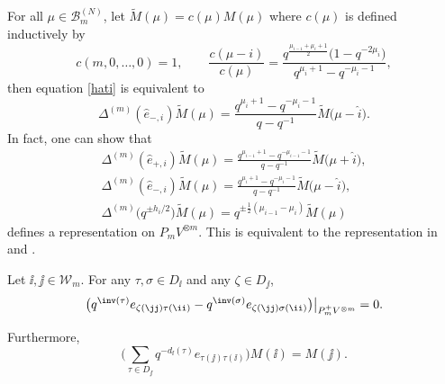 \begin{Remark}\label{ExRep}
	For all $ \mu \in \mathcal{B}^{(N)}_m $, let $ \tilde{M}(\mu)=c(\mu)M(\mu) $ where $ c(\mu) $ is defined inductively by
	\begin{equation*}%
	c(m,0,\dots,0)=1, \qquad
	\frac{c(\mu-i)}{c(\mu)}=\frac{q^{\frac{\mu_{i-1}+\mu_i+1}{2}}\big(1-q^{-2\mu_i}\big)}{q^{\mu_i+1}-q^{-\mu_i-1}} ,
	\end{equation*} then equation \eqref{hati} is equivalent to
\begin{equation*}%
	\Delta^{(m)} (\hat{e}_{-,i}) \tilde{M}(\mu) =\frac{q^{\mu_i+1}-q^{-\mu_i-1}}{q-q^{-1}} \tilde{M}\big(\mu-\hat{i}\big).
	\end{equation*} In fact, one can show that
	\begin{gather*}
		\Delta^{(m)} (\hat{e}_{+,i}) \tilde{M}(\mu) =\frac{q^{\mu_{i-1}+1}-q^{-\mu_{i-1}-1}}{q-q^{-1}} \tilde{M}\big(\mu+\hat{i}\big),\\
		\Delta^{(m)} (\hat{e}_{-,i}) \tilde{M}(\mu) =\frac{q^{\mu_i+1}-q^{-\mu_i-1}}{q-q^{-1}} \tilde{M}\big(\mu-\hat{i}\big),\\
	 \Delta^{(m)} \big(q^{\pm h_i/2}\big) \tilde{M}(\mu) =q^{\pm\frac{1}{2}(\mu_{i-1}-\mu_i)} \tilde{M}(\mu)
	\end{gather*} defines a representation on $ P_mV^{\otimes m} $. This is equivalent to the representation in \cite[equation~(3)]{KMMO} and \cite[Lemma~3.1]{KIMRN}.
\end{Remark}
\begin{Corollary}\label{Core} Let $\ii,\jj\in\mathcal{W}_m$. For any $\tau,\sigma \in D_{\ii}$ and any $\zeta \in D_{\jj}$,
\[
\big(q^{\inv(\tau)}e_{\zeta(\jj) \tau(\ii)} - q^{\inv(\sigma)}e_{\zeta(\jj) \sigma(\ii)} \big) \big|_{P_{ m}^+V^{\otimes m} } =0.
\]
	
	Furthermore,
\[
\bigg( \sum_{\tau \in D_{\jj}} q^{-d_{\ii}(\tau)}e_{\tau(\jj)\tau(\ii)} \bigg) M(\ii) = M(\jj) .
\]
\end{Corollary}

